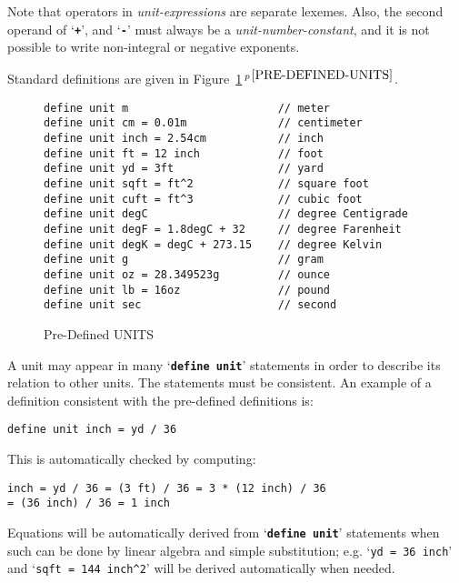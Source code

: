 \documentclass[12pt]{article}
\newcommand{\TT}[1]{{\tt \bfseries #1}}
\newcommand{\itemref}[1]{\ref{#1}$\,^{p\,\pageref{#1}}$}
\newcommand{\CIRCUM}{\textasciicircum}
\newlength{\figurewidth}
\newenvironment{boxedfigure}[1][!btp]%
	{\begin{figure*}[#1]
	 \begin{lrbox}{\figurebox}
	 \begin{minipage}{\figurewidth}

	 \vspace*{1ex}}%
	{
	 \vspace*{1ex}

	 \end{minipage}
	 \end{lrbox}
	 \begin{center}
	 \fbox{\hspace*{0.1in}\usebox{\figurebox}\hspace*{0.1in}}
	 \end{center}
	 \end{figure*}}
\newenvironment{indpar}[1][0.3in]%
	{\begin{list}{}%
		     {\setlength{\itemsep}{0in}%
		      \setlength{\topsep}{0in}%
		      \setlength{\parsep}{1ex}%
		      \setlength{\labelwidth}{#1}%
		      \setlength{\leftmargin}{#1}%
		      \addtolength{\leftmargin}{\labelsep}}%
	 \item}%
	{\end{list}}
\begin{document}
Note that operators in {\em unit-expressions} are separate
lexemes.
Also, the second operand of `\TT{+}', and
`\TT{-}' must always be a {\em unit-number-constant}, and
it is not possible to write non-integral or negative exponents.

Standard definitions are given in Figure~\itemref{PRE-DEFINED-UNITS}.

\begin{boxedfigure}[t]
\begin{indpar}\begin{verbatim}
define unit m                       // meter
define unit cm = 0.01m              // centimeter
define unit inch = 2.54cm           // inch
define unit ft = 12 inch            // foot
define unit yd = 3ft                // yard
define unit sqft = ft^2             // square foot
define unit cuft = ft^3             // cubic foot
define unit degC                    // degree Centigrade
define unit degF = 1.8degC + 32     // degree Farenheit
define unit degK = degC + 273.15    // degree Kelvin
define unit g                       // gram
define unit oz = 28.349523g         // ounce
define unit lb = 16oz               // pound
define unit sec                     // second
\end{verbatim}\end{indpar}

\caption{Pre-Defined UNITS}
\label{PRE-DEFINED-UNITS}
\end{boxedfigure}

A unit may appear in many `\TT{define unit}' statements in order to describe
its relation to other units.  The statements must be consistent.
An example of a definition consistent with the pre-defined
definitions is:

\begin{indpar}\begin{verbatim}
define unit inch = yd / 36
\end{verbatim}\end{indpar}

This is automatically checked by computing:
\begin{center}
\tt inch = yd / 36 = (3 ft) / 36 = 3 * (12 inch) / 36 \\
= (36 inch) / 36 = 1 inch
\end{center}

Equations will be automatically derived from `\TT{define unit}' statements
when such can be done by linear algebra and simple substitution; e.g.
`{\tt yd = 36 inch}' and `{\tt sqft = 144 inch\CIRCUM 2}'
will be derived automatically when needed.
\end{document}
